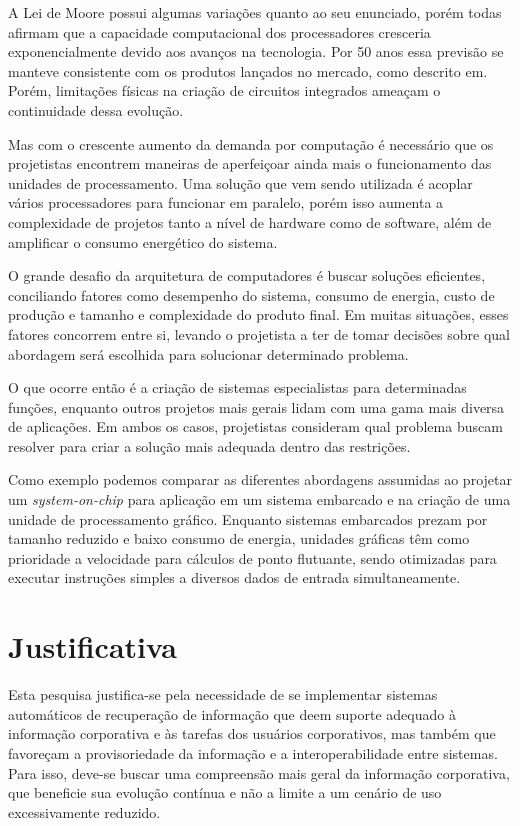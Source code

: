 A Lei de Moore possui algumas variações quanto ao seu enunciado, porém todas afirmam que a capacidade computacional dos processadores cresceria exponencialmente devido aos avanços na tecnologia. Por 50 anos essa previsão se manteve consistente com os produtos lançados no mercado, como descrito em. Porém, limitações físicas na criação de circuitos integrados ameaçam o continuidade dessa evolução. \cite{50yearsmooreslaw}

Mas com o crescente aumento da demanda por computação é necessário que os projetistas encontrem maneiras de aperfeiçoar ainda mais o funcionamento das unidades de processamento. Uma solução que vem sendo utilizada é acoplar vários processadores para funcionar em paralelo, porém isso aumenta a complexidade de projetos tanto a nível de hardware como de software, além de amplificar o consumo energético do sistema.

O grande desafio da arquitetura de computadores é buscar soluções eficientes, conciliando fatores como desempenho do sistema, consumo de energia, custo de produção e tamanho e complexidade do produto final. Em muitas situações, esses fatores concorrem entre si, levando o projetista a ter de tomar decisões sobre qual abordagem será escolhida para solucionar determinado problema.

O que ocorre então é a criação de sistemas especialistas para determinadas funções, enquanto outros projetos mais gerais lidam com uma gama mais diversa de aplicações. Em ambos os casos, projetistas consideram qual problema buscam resolver para criar a solução mais adequada dentro das restrições. 

Como exemplo podemos comparar as diferentes abordagens assumidas ao projetar um \textit{system-on-chip} para aplicação em um sistema embarcado e na criação de uma unidade de processamento gráfico. Enquanto sistemas embarcados prezam por tamanho reduzido e baixo consumo de energia, unidades gráficas têm como prioridade a velocidade para cálculos de ponto flutuante, sendo otimizadas para executar instruções simples a diversos dados de entrada simultaneamente. \cite{tanenbaumsco}




\section{Justificativa} %

Esta pesquisa justifica-se pela necessidade de se implementar sistemas automáticos de recuperação de informação que deem suporte adequado à informação corporativa e às tarefas dos usuários corporativos, mas também que favoreçam a provisoriedade da informação e a interoperabilidade entre sistemas. Para isso, deve-se buscar uma compreensão mais geral da informação corporativa, que beneficie sua evolução contínua e não a limite a um cenário de uso excessivamente reduzido.

